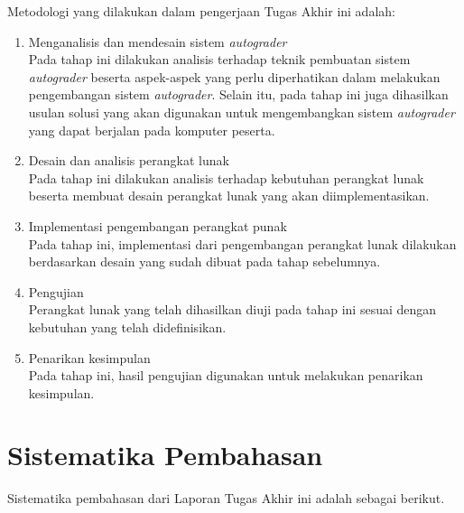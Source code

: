 \par Metodologi yang dilakukan dalam pengerjaan Tugas Akhir ini adalah:
\begin{enumerate}

	\item Menganalisis dan mendesain sistem \textit{autograder} \\ Pada tahap ini dilakukan analisis terhadap teknik pembuatan sistem \textit{autograder} beserta aspek-aspek yang perlu diperhatikan dalam melakukan pengembangan sistem \textit{autograder}. Selain itu, pada tahap ini juga dihasilkan usulan solusi yang akan digunakan untuk mengembangkan sistem \textit{autograder} yang dapat berjalan pada komputer peserta.
	
	\item Desain dan analisis perangkat lunak \\ Pada tahap ini dilakukan analisis terhadap kebutuhan perangkat lunak beserta membuat desain perangkat lunak yang akan diimplementasikan.
	
	\item Implementasi pengembangan perangkat punak \\ Pada tahap ini, implementasi dari pengembangan perangkat lunak dilakukan berdasarkan desain yang sudah dibuat pada tahap sebelumnya.
	
	\item Pengujian \\ Perangkat lunak yang telah dihasilkan diuji pada tahap ini sesuai dengan kebutuhan yang telah didefinisikan.
	
	\item Penarikan kesimpulan \\ Pada tahap ini, hasil pengujian digunakan untuk melakukan penarikan kesimpulan.

\end{enumerate}

\section{Sistematika Pembahasan}

\par Sistematika pembahasan dari Laporan Tugas Akhir ini adalah sebagai berikut.

